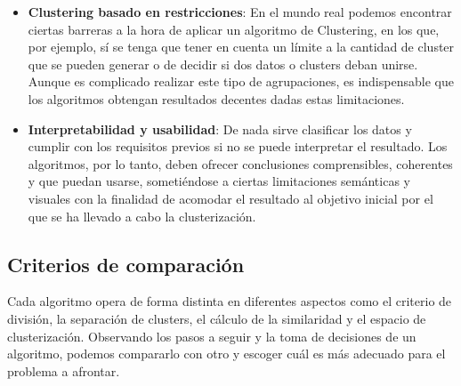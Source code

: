 \documentclass[3p,twocolumn]{elsarticle}
\begin{document}
\begin{itemize}
  \item \textbf{Clustering basado en restricciones}: En el mundo real podemos encontrar ciertas barreras a la hora de aplicar un algoritmo de Clustering, en los que, por ejemplo, sí se tenga que tener en cuenta un límite a la cantidad de cluster que se pueden generar o de decidir si dos datos o clusters deban unirse. Aunque es complicado realizar este tipo de agrupaciones, es indispensable que los algoritmos obtengan resultados decentes dadas estas limitaciones.
  
  \item \textbf{Interpretabilidad y usabilidad}: De nada sirve clasificar los datos y cumplir con los requisitos previos si no se puede interpretar el resultado. Los algoritmos, por lo tanto, deben ofrecer conclusiones comprensibles, coherentes y que puedan usarse, sometiéndose a ciertas limitaciones semánticas y visuales con la finalidad de acomodar el resultado al objetivo inicial por el que se ha llevado a cabo la clusterización.
\end{itemize}




\subsection{\textbf{Criterios de comparación}} \label{subsec:Criterios de comparación}

\cite{16} Cada algoritmo opera de forma distinta en diferentes aspectos como el criterio de división, la separación de clusters, el cálculo de la similaridad y el espacio de clusterización. Observando los pasos a seguir y la toma de decisiones de un algoritmo, podemos compararlo con otro y escoger cuál es más adecuado para el problema a afrontar. 
\end{document}
